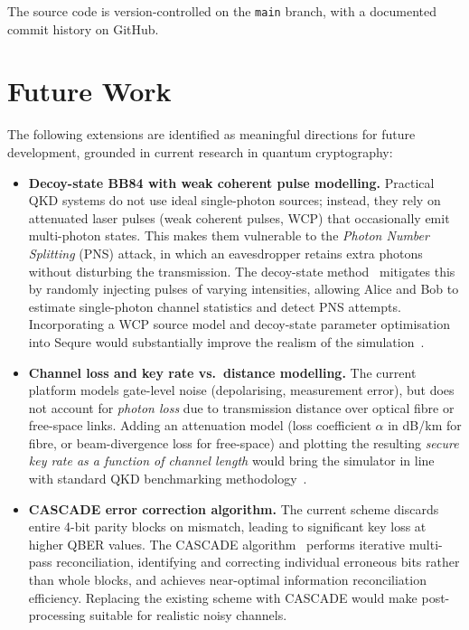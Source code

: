 \documentclass[12pt, a4paper]{article}
\begin{document}
The source code is version-controlled on the \texttt{main} branch, with a
documented commit history on GitHub.

\section{Future Work}

The following extensions are identified as meaningful directions for future
development, grounded in current research in quantum cryptography:

\begin{itemize}

  \item \textbf{Decoy-state BB84 with weak coherent pulse modelling.}
        Practical QKD systems do not use ideal single-photon sources; instead,
        they rely on attenuated laser pulses (weak coherent pulses, WCP) that
        occasionally emit multi-photon states. This makes them vulnerable to
        the \textit{Photon Number Splitting} (PNS) attack, in which an
        eavesdropper retains extra photons without disturbing the transmission.
        The decoy-state method~\cite{lo2005decoy} mitigates this by randomly
        injecting pulses of varying intensities, allowing Alice and Bob to
        estimate single-photon channel statistics and detect PNS attempts.
        Incorporating a WCP source model and decoy-state parameter
        optimisation into Sequre would substantially improve the realism of
        the simulation~\cite{arxiv2405}.

  \item \textbf{Channel loss and key rate vs.\ distance modelling.}
        The current platform models gate-level noise (depolarising, measurement
        error), but does not account for \emph{photon loss} due to transmission
        distance over optical fibre or free-space links. Adding an
        attenuation model (loss coefficient $\alpha$ in dB/km for fibre, or
        beam-divergence loss for free-space) and plotting the resulting
        \emph{secure key rate as a function of channel length} would bring
        the simulator in line with standard QKD benchmarking
        methodology~\cite{arxiv2505, arxiv2503}.

  \item \textbf{CASCADE error correction algorithm.}
        The current scheme discards entire 4-bit parity blocks on mismatch,
        leading to significant key loss at higher QBER values. The CASCADE
        algorithm~\cite{brassard1994} performs iterative multi-pass
        reconciliation, identifying and correcting individual erroneous bits
        rather than whole blocks, and achieves near-optimal information
        reconciliation efficiency. Replacing the existing scheme with CASCADE
        would make post-processing suitable for realistic noisy channels.


\end{itemize}
\end{document}
